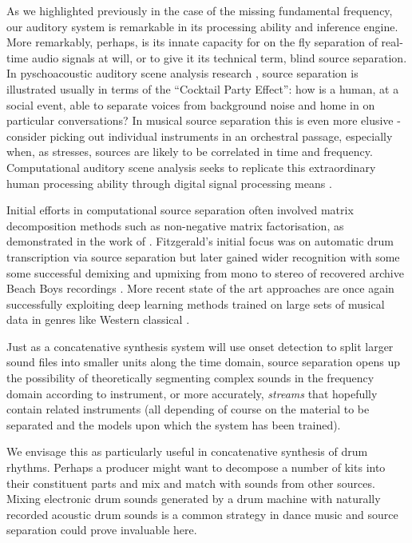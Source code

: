 {{As we highlighted previously in the case of the missing fundamental frequency, our auditory system is remarkable in its processing ability and inference engine. More remarkably,  perhaps, is its innate capacity for on the fly separation of real-time audio signals at will, or to give it its technical term, blind source separation. In pyschoacoustic auditory scene analysis research \citep{Bregman1994}, source separation is illustrated usually in terms of the ``Cocktail Party Effect'': how is a human, at a social event, able to separate voices from background noise and home in on particular conversations? In musical source separation this is even more elusive - consider picking out individual instruments in an orchestral passage, especially when, as \cite{Miron2017a} stresses, sources are likely to be correlated in time and frequency. Computational auditory scene analysis seeks to replicate this extraordinary human processing ability through digital signal processing means \citep{Wang2006}.

Initial efforts in computational source separation often involved matrix decomposition methods such as non-negative matrix factorisation, as demonstrated in the work of 
\cite{Fitz2004}. Fitzgerald's initial focus was on automatic drum transcription via source separation but later gained wider recognition with some some successful demixing and upmixing from mono to stereo of recovered archive Beach Boys recordings \citep{Fitz2004}. More recent state of the art approaches are once again successfully exploiting deep learning methods trained on large sets of musical data in genres like Western classical \citep{Miron2017a, Miron2017}.

Just as a concatenative synthesis system will use onset detection to split larger sound files into smaller units along the time domain, source separation opens up the possibility of theoretically segmenting complex sounds in the frequency domain according to instrument, or more accurately, \textit{streams} that hopefully contain related instruments (all depending of course on the material to be separated and the models upon which the system has been trained).

We envisage this as particularly useful in concatenative synthesis of drum rhythms. Perhaps a producer might want to decompose a number of kits into their constituent parts and mix and match with sounds from other sources. Mixing electronic drum sounds generated by a drum machine with naturally recorded acoustic drum sounds is a common strategy in dance music and source separation could prove invaluable here.

}}
